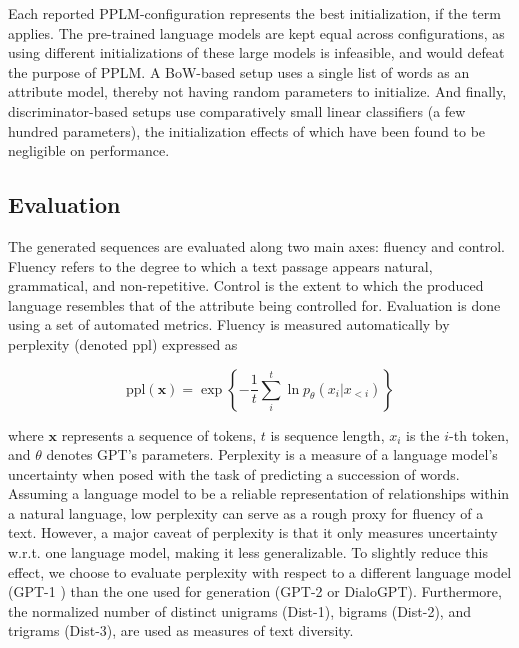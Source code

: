 Each reported PPLM-configuration represents the best initialization, if the term applies. The pre-trained language models are kept equal across configurations, as using different initializations of these large models is infeasible, and would defeat the purpose of PPLM. A BoW-based setup uses a single list of words as an attribute model, thereby not having random parameters to initialize. And finally, discriminator-based setups use comparatively small linear classifiers (a few hundred parameters), the initialization effects of which have been found to be negligible on performance.

\subsection{Evaluation}

The generated sequences are evaluated along two main axes: fluency and control. Fluency refers to the degree to which a text passage appears natural, grammatical, and non-repetitive. Control is the extent to which the produced language resembles that of the attribute being controlled for. Evaluation is done using a set of automated metrics. Fluency is measured automatically by perplexity (denoted ppl) 
expressed as

\begin{equation}
    \text{ppl}(\textbf{x}) = \exp \left\{ - \frac{1}{t} \sum_{i}^t \ln p_{\theta}(x_i | x_{<i})\right\}    
\end{equation}

where $\textbf{x}$ represents a sequence of tokens, $t$ is sequence length, $x_i$ is the $i$-th token, and $\theta$ denotes GPT's parameters. Perplexity is a measure of a language model's uncertainty when posed with the task of predicting a succession of words. Assuming a language model to be a reliable representation of relationships within a natural language, low perplexity can serve as a rough proxy for fluency of a text. However, a major caveat of perplexity is that it only measures uncertainty w.r.t. one language model, making it less generalizable. To slightly reduce this effect, we choose to evaluate perplexity with respect to a different language model (GPT-1 \citep{radford2018improving}) than the one used for generation (GPT-2 or DialoGPT).
Furthermore, the normalized number of distinct unigrams (Dist-1), bigrams (Dist-2), and trigrams (Dist-3), are used as measures of text diversity. 

